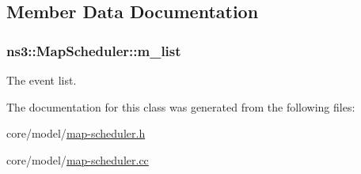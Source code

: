 \subsection{Member Data Documentation}
\subsubsection[{\texorpdfstring{m\+\_\+list}{m_list}}]{ ns3\+::\+Map\+Scheduler\+::m\+\_\+list\hspace{0.3cm}{\ttfamily [private]}}\hypertarget{classns3_1_1MapScheduler_ab92a615518fcb443aa2453c3a56f4ce2}{}\label{classns3_1_1MapScheduler_ab92a615518fcb443aa2453c3a56f4ce2}
The event list. 

The documentation for this class was generated from the following files\+:\begin{DoxyCompactItemize}
\item 
core/model/\hyperlink{map-scheduler_8h}{map-\/scheduler.\+h}\item 
core/model/\hyperlink{map-scheduler_8cc}{map-\/scheduler.\+cc}\end{DoxyCompactItemize}
